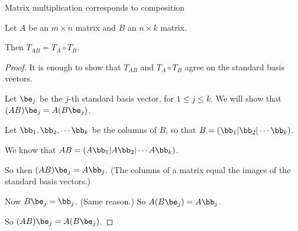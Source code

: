 \documentclass{beamer}
\begin{document}
\beamerdefaultoverlayspecification{}
\begin{frame}{Matrix multiplication corresponds to composition}

\begin{theorem}
Let $A$ be an $m\times n$ matrix and $B$ an $n\times k$ matrix.

\pause

Then $T_{AB} = T_A \circ T_B$.
\end{theorem}

\pause

\begin{proof}
It is enough to show that $T_{AB}$ and $T_A \circ T_B$ agree on the standard
basis vectors.

\pause

Let $\be_j$ be the $j$-th standard basis vector, for $1\leq j\leq k$. We will show that
$(AB)\be_j = A (B \be_j)$.

\pause

Let $\bb_1, \bb_2,\cdots \bb_k$ be the columns of $B$, so that
$B = (\bb_1 \vert \bb_2 \vert \cdots \bb_k)$.

 \pause

 We know that $AB = (A \bb_1 \vert A \bb_2 \vert \cdots A \bb_k)$.

 \pause

 So then $(AB)\be_j = A\bb_j$. (The columns of a matrix equal the images of the standard basis vectors.)

 \pause

 Now $B \be_j = \bb_j$. (Same reason.) So $A (B \be_j) = A\bb_j$.

 \pause

 So $(AB)\be_j = A (B \be_j)$.

\end{proof}

\end{frame}

\end{document}
